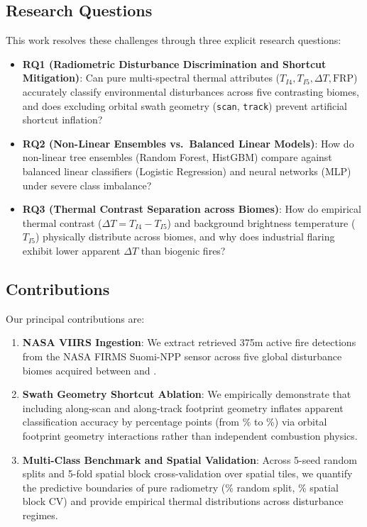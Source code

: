 \documentclass[conference]{IEEEtran}
\begin{document}
\subsection{Research Questions}
\label{sec:rqs}
This work resolves these challenges through three explicit research questions:
\begin{itemize}
    \item \textbf{RQ1 (Radiometric Disturbance Discrimination and Shortcut Mitigation)}: Can pure multi-spectral thermal attributes ($T_{I4}, T_{I5}, \Delta T, \text{FRP}$) accurately classify environmental disturbances across five contrasting biomes, and does excluding orbital swath geometry (\texttt{scan}, \texttt{track}) prevent artificial shortcut inflation?
    \item \textbf{RQ2 (Non-Linear Ensembles vs.\ Balanced Linear Models)}: How do non-linear tree ensembles (Random Forest, HistGBM) compare against balanced linear classifiers (Logistic Regression) and neural networks (MLP) under severe class imbalance?
    \item \textbf{RQ3 (Thermal Contrast Separation across Biomes)}: How do empirical thermal contrast ($\Delta T = T_{I4} - T_{I5}$) and background brightness temperature ($T_{I5}$) physically distribute across biomes, and why does industrial flaring exhibit lower apparent $\Delta T$ than biogenic fires?
\end{itemize}

\subsection{Contributions}
Our principal contributions are:
\begin{enumerate}
    \item \textbf{NASA VIIRS Ingestion}: We extract \numDetections{} retrieved 375m active fire detections from the NASA FIRMS Suomi-NPP sensor across five global disturbance biomes acquired between \dateMin{} and \dateMax{}.
    \item \textbf{Swath Geometry Shortcut Ablation}: We empirically demonstrate that including along-scan and along-track footprint geometry inflates apparent classification accuracy by \shortcutBoost{} percentage points (from \accHgb{}\% to \accSwathGeom{}\%) via orbital footprint geometry interactions rather than independent combustion physics.
    \item \textbf{Multi-Class Benchmark and Spatial Validation}: Across 5-seed random splits and 5-fold spatial block cross-validation over \numSpatialTiles{} spatial tiles, we quantify the predictive boundaries of pure radiometry (\accRf{}\% random split, \accSpatialBlockCv{}\% spatial block CV) and provide empirical thermal distributions across disturbance regimes.
\end{enumerate}
\end{document}
